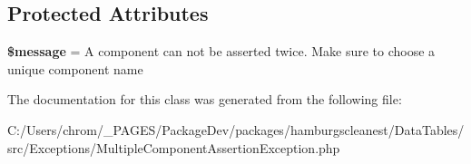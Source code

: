 \subsection*{Protected Attributes}
\begin{DoxyCompactItemize}
\item 
\mbox{\label{classhamburgscleanest_1_1_data_tables_1_1_exceptions_1_1_multiple_component_assertion_exception_abf17cb2dba2ed17cb28aa5f37deb5293}} 
{\bfseries \$message} = \textquotesingle{}A component can not be asserted twice. Make sure to choose a unique component name\textquotesingle{}
\end{DoxyCompactItemize}


The documentation for this class was generated from the following file\+:\begin{DoxyCompactItemize}
\item 
C\+:/\+Users/chrom/\+\_\+\+P\+A\+G\+E\+S/\+Package\+Dev/packages/hamburgscleanest/\+Data\+Tables/src/\+Exceptions/Multiple\+Component\+Assertion\+Exception.\+php\end{DoxyCompactItemize}
